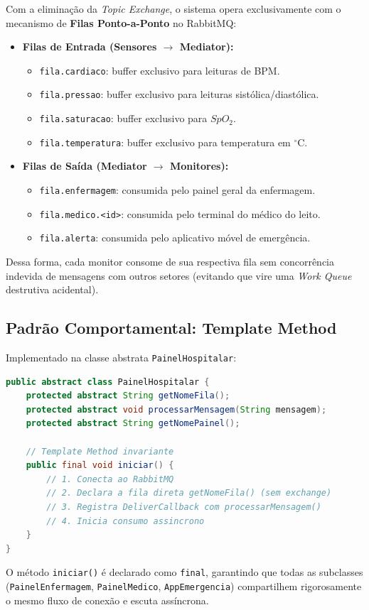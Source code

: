\documentclass[12pt,a4paper]{article}
\begin{document}
Com a eliminação da \textit{Topic Exchange}, o sistema opera exclusivamente com o mecanismo de \textbf{Filas Ponto-a-Ponto} no RabbitMQ:
\begin{itemize}
    \item \textbf{Filas de Entrada (Sensores $\rightarrow$ Mediator):}
    \begin{itemize}
        \item \texttt{fila.cardiaco}: buffer exclusivo para leituras de BPM.
        \item \texttt{fila.pressao}: buffer exclusivo para leituras sistólica/diastólica.
        \item \texttt{fila.saturacao}: buffer exclusivo para $SpO_2$.
        \item \texttt{fila.temperatura}: buffer exclusivo para temperatura em $^\circ\text{C}$.
    \end{itemize}
    \item \textbf{Filas de Saída (Mediator $\rightarrow$ Monitores):}
    \begin{itemize}
        \item \texttt{fila.enfermagem}: consumida pelo painel geral da enfermagem.
        \item \texttt{fila.medico.<id>}: consumida pelo terminal do médico do leito.
        \item \texttt{fila.alerta}: consumida pelo aplicativo móvel de emergência.
    \end{itemize}
\end{itemize}
Dessa forma, cada monitor consome de sua respectiva fila sem concorrência indevida de mensagens com outros setores (evitando que vire uma \textit{Work Queue} destrutiva acidental).

\subsection{Padrão Comportamental: Template Method}

Implementado na classe abstrata \texttt{PainelHospitalar}:
\begin{lstlisting}[language=Java]
public abstract class PainelHospitalar {
    protected abstract String getNomeFila();
    protected abstract void processarMensagem(String mensagem);
    protected abstract String getNomePainel();

    // Template Method invariante
    public final void iniciar() {
        // 1. Conecta ao RabbitMQ
        // 2. Declara a fila direta getNomeFila() (sem exchange)
        // 3. Registra DeliverCallback com processarMensagem()
        // 4. Inicia consumo assincrono
    }
}
\end{lstlisting}
O método \texttt{iniciar()} é declarado como \texttt{final}, garantindo que todas as subclasses (\texttt{PainelEnfermagem}, \texttt{PainelMedico}, \texttt{AppEmergencia}) compartilhem rigorosamente o mesmo fluxo de conexão e escuta assíncrona.
\end{document}
